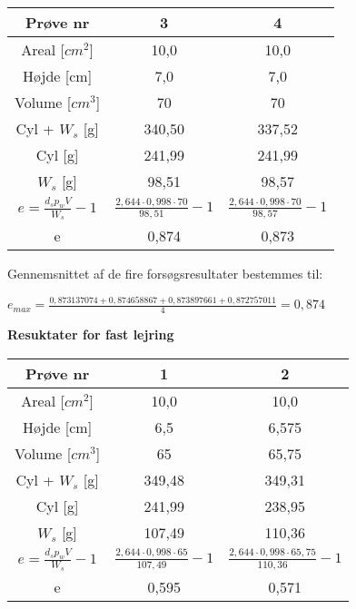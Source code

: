 \begin{center}
	\begin{tabular}{ |c|c|c| } 
		\hline
		Prøve nr & 3 & 4 \\	\hline
		Areal [$cm^2$] & 10,0 & 10,0 \\ \hline
		Højde [cm] & 7,0 & 7,0 \\ \hline
		Volume [$cm^3$] & 70 & 70 \\ \hline
		Cyl + $W_s$ [g] & 340,50 & 337,52 \\ \hline
		Cyl [g] & 241,99 & 241,99 \\ \hline
		$W_s$ [g] & 98,51 & 98,57 \\ \hline
		$e=\frac{d_sp_wV}{W_s}-1$ & $\frac{2,644\cdot0,998\cdot70}{98,51}-1$ & $\frac{2,644\cdot0,998\cdot70}{98,57}-1$  \\ \hline
		e & 0,874 & 0,873\\ \hline
	\end{tabular}
\end{center}

Gennemsnittet af de fire forsøgsresultater bestemmes til:
\begin{center}
	$e_{max}=\frac{0,873137074 + 0,874658867 + 0,873897661 + 0,872757011}{4}=0,\!874$
\end{center}

\textbf{Resuktater for fast lejring}
\begin{center}
	\begin{tabular}{ |c|c|c| } 
		\hline
		Prøve nr & 1 & 2 \\	\hline 
		Areal [$cm^2$] & 10,0 & 10,0 \\ \hline
		Højde [cm] & 6,5 & 6,575 \\ \hline
		Volume [$cm^3$] & 65 & 65,75 \\ \hline
		Cyl + $W_s$ [g] & 349,48 & 349,31 \\ \hline
		Cyl [g] & 241,99 & 238,95 \\ \hline
		$W_s$ [g] & 107,49 & 110,36 \\ \hline
		$e=\frac{d_sp_wV}{W_s}-1$ & $\frac{2,644\cdot0,998\cdot65}{107,49}-1$ & $\frac{2,644\cdot0,998\cdot65,75}{110,36}-1$ \\ \hline
		e & 0,595 & 0,571 \\ \hline
	\end{tabular}
\end{center}

